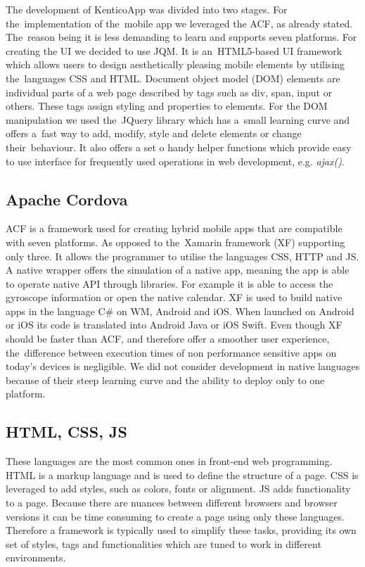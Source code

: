 The development of KenticoApp was divided into two stages. For the~implementation of the~mobile app we leveraged the ACF, as already stated. The~reason being it is less demanding to learn and supports seven platforms. For creating the UI  we decided to use JQM. It is an~HTML5-based UI framework which allows users to design aesthetically pleasing mobile elements by utilising the~languages CSS and HTML. Document object model (DOM) elements are individual parts of a web page described by tags such as div, span, input or others. These tags assign styling and properties to elements. For the DOM manipulation we used the~JQuery library which has a~small learning curve and offers a~fast way to add, modify, style and delete elements or change their~behaviour. It also offers a set o handy helper functions which provide easy to use interface for frequently used operations in web development, e.g. \textit{ajax()}.

\subsection{Apache Cordova}
ACF is a framework used for creating hybrid mobile apps that are compatible with seven platforms. As opposed to the~Xamarin framework (XF) supporting only three. It allows the programmer to utilise the languages CSS, HTTP and JS. A native wrapper offers the simulation of a native app, meaning the app is able to operate native API through libraries. For example it is able to access the gyroscope information or open the native calendar. XF is used to build native apps in the language C\# on WM, Android and iOS. When launched on Android or iOS its code is translated into Android Java or iOS Swift. Even though XF should be faster than ACF, and therefore offer a smoother user experience, the~difference between execution times of non performance sensitive apps on today's devices is negligible. We did not consider development in native languages because of their steep learning curve and the ability to deploy only to one platform.
\subsection{HTML, CSS, JS}
These languages are the most common ones in front-end web programming. HTML is a markup language and is used to define the structure of a page. CSS is leveraged to add styles, such as colors, fonts or alignment. JS adds functionality to a page. Because there are nuances between different browsers and browser versions it can be time consuming to create a page using only these languages. Therefore a framework is typically used to simplify these tasks, providing its own set of styles, tags and functionalities which are tuned to work in different environments.

